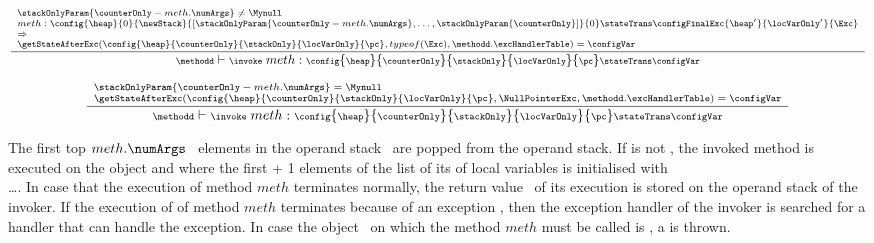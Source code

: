 \begin{itemize}
	  $${\scriptsize \frac{\begin{array}{l}
	                        \stackOnlyParam{ \counterOnly - meth.\numArgs } \neq \Mynull   \\
	                         meth: %
			                        \config{\heap}       
                                                       {0}
						       {\newStack }
                                                       {\lbrack \stackOnlyParam{ \counterOnly - meth.\numArgs },\ldots ,\stackOnlyParam{ \counterOnly} \rbrack }
						       {0} 
						         \stateTrans
						       \configFinalExc{\heap'}{\locVarOnly'}{\Exc}\\
					   \Rightarrow \\
					  \getStateAfterExc( \config{\heap}{\counterOnly}{\stackOnly}{\locVarOnly}{\pc}, typeof(\Exc)  ,\methodd.\excHandlerTable ) =  \configVar
	         \end{array} 	      
	         }	         
	         {\methodd \vdash \invoke \  meth :  \config{\heap}{\counterOnly}{\stackOnly}{\locVarOnly}{\pc} 
		                        \stateTrans  
					\configVar} } $$


	  $${\scriptsize \frac{\begin{array}{l}
	                         \stackOnlyParam{ \counterOnly - meth.\numArgs } = \Mynull   \\ 
				 \getStateAfterExc( \config{\heap}{\counterOnly}{\stackOnly}{\locVarOnly}{\pc},\NullPointerExc,\methodd.\excHandlerTable ) =  \configVar
	         \end{array} 	      
	         }	         
	         {\methodd \vdash \invoke \  meth :  \config{\heap}{\counterOnly}{\stackOnly}{\locVarOnly}{\pc} 
		                        \stateTrans  
					\configVar} } $$					
	  

	 The first top $meth.\numArgs$ \ elements in the operand stack \stackOnly \ are popped from the operand stack. If 
          is not \Mynull, the invoked method is executed on the object    
	 and where the first \numArgs + 1 elements of the list of its of local variables is initialised with \\
          \ldots \stackOnlyParam{\counterOnly}. In case that the execution of method $meth$
	 terminates normally, the return value \Res \  of its execution is stored on the operand stack of the invoker. 
	 If the execution of of method $meth$ terminates because of an exception \Exc, then the exception handler of the invoker is searched for
	 a handler that can handle the exception. In case the object   \  on which the  method $meth$ must be 
	 called is \Mynull, a \NullPointerExc is thrown.  			





\end{itemize}
